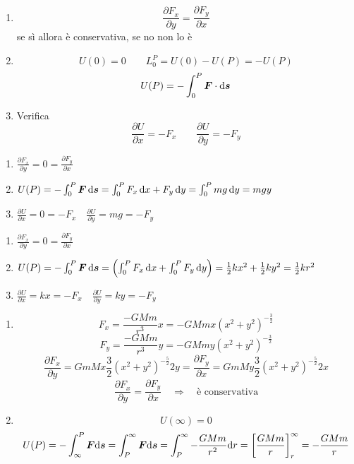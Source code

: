 \begin{enumerate}
  \item
        \[\frac {\partial F_x}{\partial y}=\frac {\partial
            F_y}{\partial x}
        \]
        se sì allora è conservativa, se no non lo è

        \item\[U(0)=0 \qquad L_0^P=U(0)-U(P)=-U(P)\]
        \[U(P)=-\int_0^P \boldsymbol{F}\cdot\mathrm{d} \boldsymbol{s}\]

  \item Verifica
        \[\frac {\partial U}{\partial x}=-F_x \qquad \frac{\partial U}{\partial y}=-F_y\]
\end{enumerate}
\begin{Es}[Forza peso $F_x=0 \quad F_y=mg$]
  \begin{enumerate}
    \item $\frac {\partial F_x}{\partial y}=0=\frac {\partial
              F_y}{\partial x}$

    \item $U(P)=-\int_0^P  \boldsymbol{F}\, \mathrm{d} \boldsymbol{s}=\int_0^P F_x\, \mathrm{d} x+F_y\, \mathrm{d}
            y=\int_0^P mg \, \mathrm{d} y = mgy$

    \item $\frac {\partial U}{\partial x}=0=-F_x\quad \frac {\partial
              U}{\partial y}=mg=-F_y$
  \end{enumerate}
\end{Es}
\begin{Es}[Forza elastica $F_x=-kx \quad F_y=-ky$]
  \begin{enumerate}
    \item$\frac {\partial F_x}{\partial y}=0=\frac {\partial
        F_y}{\partial x}$

    \item$U(P)=-\int_0^P \boldsymbol{F}\, \mathrm{d} \boldsymbol{s}=\left(\int_0^P F_x\, \mathrm{d} x+\int_0^P
      F_y\, \mathrm{d} y \right)=\frac
      {1}{2}kx^2+\frac{1}{2}ky^2=\frac{1}{2}kr^2$

    \item$\frac{\partial U}{\partial x}=kx=-F_x \quad \frac{\partial
        U}{\partial y}=ky=-F_y$
  \end{enumerate}
\end{Es}
\begin{Es}[Forza gravitazionale $ \ve{F}=-G\frac{Mm}{{r^3}}\ve r \quad
      r=\sqrt{x^2+y^2}$]

  \begin{enumerate}

    \item
          \[F_x=\frac {-GMm}{r^3}x=-GMmx(x^2+y^2)^{-\frac{3}{2}}\]
          \[F_y=\frac {-GMm}{r^3}y=-GMmy(x^2+y^2)^{-\frac{3}{2}}\]
          \[\frac{\partial F_x}{\partial y}=GmMx\frac {3}{2}(x^2+y^2)^{-\frac{5}{2}}2y=\frac{\partial F_y}{\partial x}=GmMy\frac {3}{2}(x^2+y^2)^{-\frac{5}{2}}2x \]
          \[\frac{\partial F_x}{\partial y}=\frac{\partial F_y}{\partial x}\quad \Rightarrow\quad \text{è conservativa}\]

          \item\[U(\infty)=0\]
          \[U(P)=-\int_\infty ^P \boldsymbol{F} \mathrm{d} \boldsymbol{s}=\int_P^\infty \boldsymbol{F}\mathrm{d} \boldsymbol{s}=\int_P^\infty -\frac{GMm}{r^2}\mathrm{d} r=\left[\frac{GMm}{r}\right]_r^\infty=-\frac{GMm}{r}\]
  \end{enumerate}
\end{Es}
